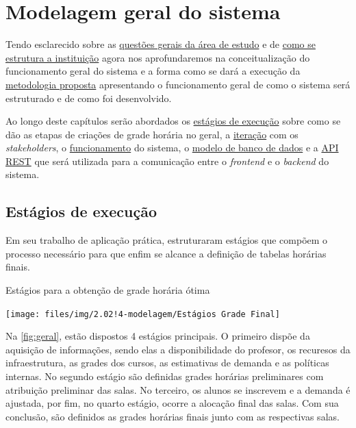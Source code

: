 \chapter{Modelagem geral do sistema} \label{chap:modelagem} %

Tendo esclarecido sobre as \hyperref[chap:marco]{questões gerais da área de estudo} e de \hyperref[chap:instituicao]{como se estrutura a instituição} agora nos aprofundaremos na conceitualização do funcionamento geral do sistema e a forma como se dará a execução da \hyperref[sec:Metodologia]{metodologia proposta} apresentando o funcionamento geral de como o sistema será estruturado e de como foi desenvolvido.

Ao longo deste capítulos serão abordados os \hyperref[sec:estagios]{estágios de execução} sobre como se dão as etapas de criações de grade horária no geral, a \hyperref[sec:iteracao]{iteração} com os \textit{stakeholders}, o \hyperref[sec:funcionamento]{funcionamento} do sistema, o \hyperref[sec:ModelagemBD]{modelo de banco de dados} e a \hyperref[sec:REST]{API REST} que será utilizada para a comunicação entre o \textit{frontend} e o \textit{backend} do sistema.

\section{Estágios de execução} \label{sec:estagios} %

Em seu trabalho de aplicação prática,  estruturaram estágios que compõem o processo necessário para que enfim se alcance a definição de tabelas horárias finais.

\begin{CenteredFigure} \caption{Estágios para a obtenção de grade horária ótima} \label{fig:geral}
  \texttt{[image: files/img/2.02!4-modelagem/Estágios Grade Final]}
\end{CenteredFigure}

Na \autoref{fig:geral}, estão dispostos 4 estágios principais. O primeiro dispõe da aquisição de informações, sendo elas a disponibilidade do profesor, os recuresos da infraestrutura, as grades dos cursos, as estimativas de demanda e as políticas internas. No segundo estágio são definidas grades horárias preliminares com atribuição preliminar das salas. No terceiro, os alunos se inscrevem e a demanda é ajustada, por fim, no quarto estágio, ocorre a alocação final das salas. Com sua conclusão, são definidos as grades horárias finais junto com as respectivas salas.

